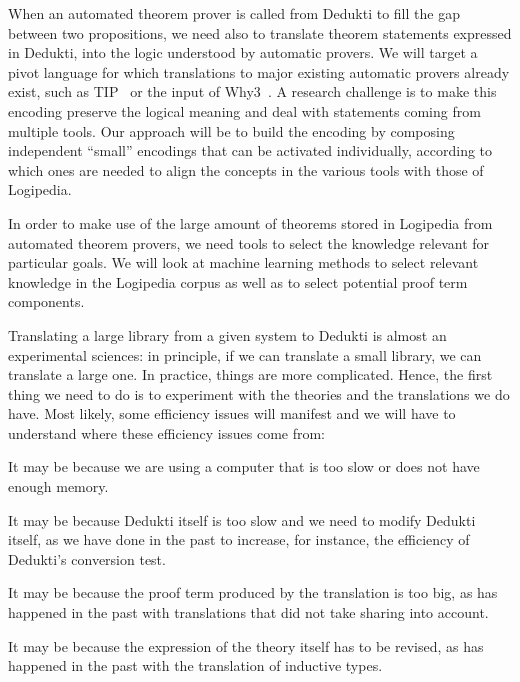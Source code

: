 When an automated theorem prover is called from Dedukti to fill the
gap between two propositions, we need also to translate theorem
statements expressed in Dedukti, into the logic understood by
automatic provers. We will target a pivot language for which
translations to major existing automatic provers already exist, such
as TIP~\cite{DBLP:conf/mkm/ClaessenJRS15} or the input of
Why3~\cite{DBLP:conf/esop/FilliatreP13}. A research challenge is to
make this encoding preserve the logical meaning and deal with
statements coming from multiple tools. Our approach will be to build
the encoding by composing independent ``small'' encodings that can be
activated individually, according to which ones are needed to align
the concepts in the various tools with those of Logipedia.

In order to make use of the large amount of theorems stored in
Logipedia from automated theorem provers, we need tools to select the
knowledge relevant for particular goals. We will look at machine
learning methods to select relevant knowledge in the Logipedia corpus
as well as to select potential proof term components.


Translating a large library from a given system to Dedukti is almost
an experimental sciences: in principle, if we can translate a small
library, we can translate a large one. In practice, things are more
complicated.  Hence, the first thing we need to do is to experiment
with the theories and the translations we do have. Most likely, some
efficiency issues will manifest and we will have to understand where
these efficiency issues come from:

\begin{compactitem}
\item It may be because we are using a computer that is too slow or
  does not have enough memory.
\item It may be because Dedukti itself is too slow and we need to modify
  Dedukti itself, as we have done in the past to increase, for instance,
  the efficiency of Dedukti's conversion test.
\item It may be because the proof term produced by the translation is
  too big, as has happened in the past with translations that did not
  take sharing into account.
\item It may be because the expression of the theory itself has to be
  revised, as has happened in the past with the translation of
  inductive types.
\end{compactitem}

